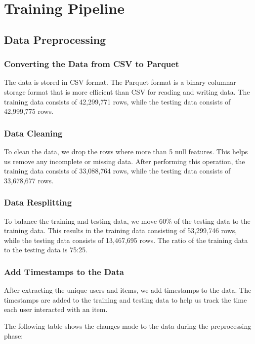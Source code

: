\section{Training Pipeline}

\subsection{Data Preprocessing}

\subsubsection{Converting the Data from CSV to Parquet}

The data is stored in CSV format. The Parquet format is a binary columnar storage format that is more efficient than CSV for reading and writing data. The training data consists of 42,299,771 rows, while the testing data consists of 42,999,775 rows.

\subsubsection{Data Cleaning}

To clean the data, we drop the rows where more than 5 null features. This helps us remove any incomplete or missing data. After performing this operation, the training data consists of 33,088,764 rows, while the testing data consists of 33,678,677 rows.


\subsubsection{Data Resplitting}

To balance the training and testing data, we move 60\% of the testing data to the training data. This results in the training data consisting of 53,299,746 rows, while the testing data consists of 13,467,695 rows. The ratio of the training data to the testing data is 75:25.

\subsubsection{Add Timestamps to the Data}

After extracting the unique users and items, we add timestamps to the data. The timestamps are added to the training and testing data to help us track the time each user interacted with an item.

The following table shows the changes made to the data during the preprocessing phase:

